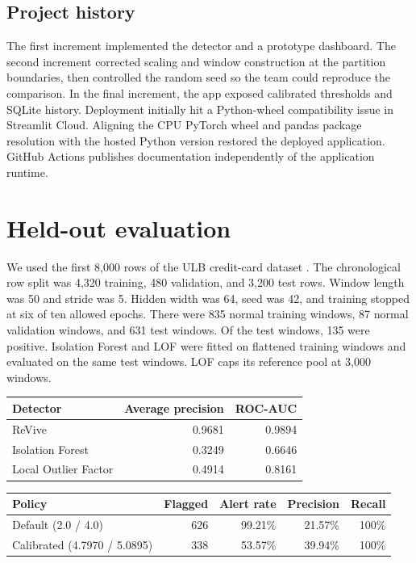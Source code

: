\documentclass[11pt,a4paper]{article}
\begin{document}
\subsection{Project history}
The first increment implemented the detector and a prototype dashboard. The second increment corrected scaling and window construction at the partition boundaries, then controlled the random seed so the team could reproduce the comparison. In the final increment, the app exposed calibrated thresholds and SQLite history. Deployment initially hit a Python-wheel compatibility issue in Streamlit Cloud. Aligning the CPU PyTorch wheel and pandas package resolution with the hosted Python version restored the deployed application. GitHub Actions publishes documentation independently of the application runtime.

\section{Held-out evaluation}
We used the first 8,000 rows of the ULB credit-card dataset \cite{ulb}. The chronological row split was 4,320 training, 480 validation, and 3,200 test rows. Window length was 50 and stride was 5. Hidden width was 64, seed was 42, and training stopped at six of ten allowed epochs. There were 835 normal training windows, 87 normal validation windows, and 631 test windows. Of the test windows, 135 were positive. Isolation Forest and LOF were fitted on flattened training windows and evaluated on the same test windows. LOF caps its reference pool at 3,000 windows.

\begin{center}
\begin{tabular}{lrr}
\toprule
Detector & Average precision & ROC-AUC\\
\midrule
ReVive & 0.9681 & 0.9894\\
Isolation Forest & 0.3249 & 0.6646\\
Local Outlier Factor & 0.4914 & 0.8161\\
\bottomrule
\end{tabular}

\vspace{1em}
\begin{tabular}{lrrrr}
\toprule
Policy & Flagged & Alert rate & Precision & Recall\\
\midrule
Default (2.0 / 4.0) & 626 & 99.21\% & 21.57\% & 100\%\\
Calibrated (4.7970 / 5.0895) & 338 & 53.57\% & 39.94\% & 100\%\\
\bottomrule
\end{tabular}
\end{center}
\end{document}

